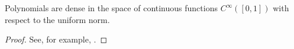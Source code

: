 % 

\begin{theorem}[\waT]

Polynomials are dense in the space of continuous functions $C^{\infty}([0, 1])$ with respect to the uniform norm.

\label{thm:Weierstrass}
\end{theorem}

\begin{proof}
	See, for example, \cite{jackson1934proof,bialas1996theorem,young2006stone,aktan2024short}.
\end{proof}


\endinput  %
